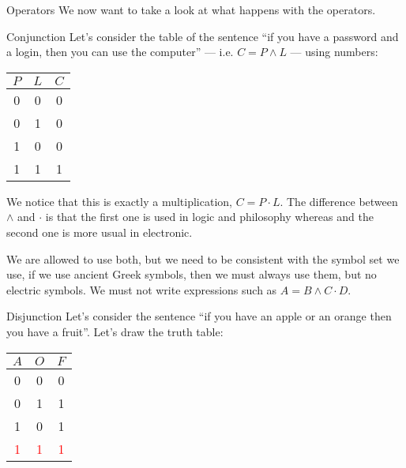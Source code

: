 \documentclass[a4paper]{article}
\begin{document}
\begin{parag}{Operators}
    We now want to take a look at what happens with the operators.

    \begin{subparag}{Conjunction}
        Let's consider the table of the sentence ``if you have a password and a login, then you can use the computer'' --- i.e. $C = P \land L$ --- using numbers:
        \begin{center}
            \begin{tabular}{c|c|c}
                $P$ & $L$ & $C$ \\
                \hline
                0 & 0 & 0 \\
                0 & 1 & 0 \\
                1 & 0 & 0 \\
                1 & 1 & 1 \\
            \end{tabular}
        \end{center}
        
        We notice that this is exactly a multiplication, $C = P\cdot L$. The difference between $\land$ and $\cdot$ is that the first one is used in logic and philosophy whereas and the second one is more usual in electronic.

        We are allowed to use both, but we need to be consistent with the symbol set we use, if we use ancient Greek symbols, then we must always use them, but no electric symbols. We must not write expressions such as $A = B \land C \cdot D$.
    \end{subparag}

    \begin{subparag}{Disjunction}
        Let's consider the sentence ``if you have an apple or an orange then you have a fruit''. Let's draw the truth table:
        \begin{center}
            \begin{tabular}{c|c|c}
                $A$ & $O$ & $F$ \\
                \hline
                0 & 0 & 0 \\
                0 & 1 & 1 \\
                1 & 0 & 1 \\
                \textcolor{red}{1} & \textcolor{red}{1} & \textcolor{red}{1} \\
            \end{tabular}
        \end{center}
        


\end{subparag}
\end{parag}
\end{document}
